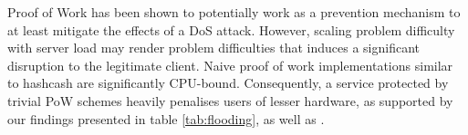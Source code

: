 Proof of Work has been shown to potentially work as a prevention mechanism to at least mitigate the effects of a DoS attack\cite{JuelsB99}. However, scaling problem difficulty with server load may render problem difficulties that induces a significant disruption to the legitimate client. Naive proof of work implementations similar to hashcash are significantly CPU-bound\cite{hashcashbench}. Consequently, a service protected by trivial PoW schemes heavily penalises users of lesser hardware, as supported by our findings presented in table \ref{tab:flooding}, as well as \citeauthor{Tsang2008}\cite{Tsang2008}.

\begin{comment}
Proof of Work has been shown to potentially work as a prevention mechanism to at least mitigate the effects of a DoS attack without making an as assumption about the source.[källa] However, \citeauthor{LaurieC04} concluded in the paper \citetitle{LaurieC04}, that PoW on it's own, is not a feasible solution to fighting spam and denial of service attacks. This is because the classical implementation of Proof of Work does not seperate legitimate users from attackers. Hence, problems from a Proof of Work protected system would not discourage abusers of the system without having an unacceptable effect on legitimate users. 
\end{comment}